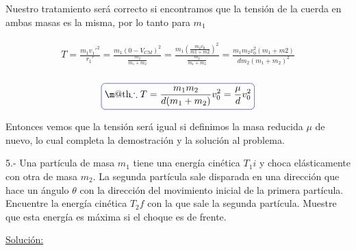 \documentclass[a4paper,10pt]{article}
\makeatletter
\numberwithin{equation}{section}
\newcommand*{\boxcolor}{blue}
\renewcommand{\boxed}[1]{\textcolor{\boxcolor}{%
\tikz[baseline={([yshift=-1ex]current bounding box.center)}] \node [rectangle, minimum width=1ex,rounded corners,draw] {\normalcolor\m@th$\displaystyle#1$};}}
\makeatother
\begin{document}
Nuestro tratamiento será correcto si encontramos que la tensión de la cuerda
en ambas masas es la misma, por lo tanto para $m_1$

\begin{align*}
\begin{split}
 T = \frac{m_1 v_1'^2}{r_1'} = \frac{m_1(0 - V_{CM})^2}{\frac{m_2}{m_1+m_2}} =
 \frac{m_1 (\frac{m_2 v_0}{m1+m2})^2}{\frac{m_2}{m_1+m_2}} =
 \frac{m_1 m_2 v_0^2 (m_1 + m2)}{d m_2 (m_1 + m_2)^2} \\
 \end{split}
\end{align*}

\begin{equation}
 \boxed{\therefore T = \frac{m_1 m_2}{d(m_1 + m_2)}v_0^2 = \frac{\mu}{d} v_0^2} %
\end{equation}

Entonces vemos que la tensión será igual si definimos la masa reducida $\mu$ de nuevo,
lo cual completa la demostración y la solución al problema.





\vspace{.3cm}

5.- Una partícula de masa $m_1$ tiene una energía cinética $T_1i$ y choca elásticamente 
con otra de masa $m_2$. La segunda partícula sale disparada en una dirección que hace un
ángulo $\theta$ con la dirección del movimiento inicial de la primera partícula. Encuentre
la energía cinética $T_2f$ con la que sale la segunda partícula. Muestre que esta energía
es máxima si el choque es de frente.

\vspace{.3cm}

\underline{Solución:}

\vspace{.3cm}

\end{document}
